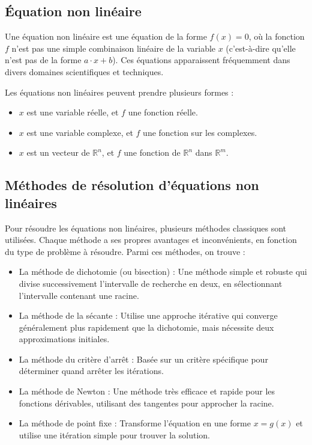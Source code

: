 \documentclass{article}
\begin{document}
\subsection{Équation non linéaire}
Une équation non linéaire est une équation de la forme $f(x) = 0$, où la fonction $f$ n'est pas une simple combinaison linéaire de la variable $x$ (c'est-à-dire qu'elle n'est pas de la forme $a \cdot x + b$). Ces équations apparaissent fréquemment dans divers domaines scientifiques et techniques.

Les équations non linéaires peuvent prendre plusieurs formes :
\begin{itemize}
    \item $x$ est une variable réelle, et $f$ une fonction réelle.
    \item $x$ est une variable complexe, et $f$ une fonction sur les complexes.
    \item $x$ est un vecteur de $\mathbb{R}^n$, et $f$ une fonction de $\mathbb{R}^n$ dans $\mathbb{R}^m$.
\end{itemize}

\subsection{Méthodes de résolution d'équations non linéaires}
Pour résoudre les équations non linéaires, plusieurs méthodes classiques sont utilisées. Chaque méthode a ses propres avantages et inconvénients, en fonction du type de problème à résoudre. Parmi ces méthodes, on trouve :

\begin{itemize}
    \item La méthode de dichotomie (ou bisection) : Une méthode simple et robuste qui divise successivement l'intervalle de recherche en deux, en sélectionnant l'intervalle contenant une racine.
    \item La méthode de la sécante : Utilise une approche itérative qui converge généralement plus rapidement que la dichotomie, mais nécessite deux approximations initiales.
    \item La méthode du critère d'arrêt : Basée sur un critère spécifique pour déterminer quand arrêter les itérations.
    \item La méthode de Newton : Une méthode très efficace et rapide pour les fonctions dérivables, utilisant des tangentes pour approcher la racine.
    \item La méthode de point fixe : Transforme l'équation en une forme $x = g(x)$ et utilise une itération simple pour trouver la solution.
\end{itemize}
\end{document}

